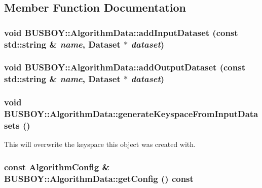 \subsection{Member Function Documentation}
\hypertarget{classBUSBOY_1_1AlgorithmData_a23f52c3ffb2d7f2806014f862449b813}{
\subsubsection[{addInputDataset}]{\setlength{\rightskip}{0pt plus 5cm}void BUSBOY::AlgorithmData::addInputDataset (const std::string \& {\em name}, \/  {\bf Dataset} $\ast$ {\em dataset})}}
\label{classBUSBOY_1_1AlgorithmData_a23f52c3ffb2d7f2806014f862449b813}
\hypertarget{classBUSBOY_1_1AlgorithmData_affca1d960445e7bb5b05b7e4878ccaf9}{
\subsubsection[{addOutputDataset}]{\setlength{\rightskip}{0pt plus 5cm}void BUSBOY::AlgorithmData::addOutputDataset (const std::string \& {\em name}, \/  {\bf Dataset} $\ast$ {\em dataset})}}
\label{classBUSBOY_1_1AlgorithmData_affca1d960445e7bb5b05b7e4878ccaf9}
\hypertarget{classBUSBOY_1_1AlgorithmData_a8d530109cffd59b9274dbe9890173446}{
\subsubsection[{generateKeyspaceFromInputDatasets}]{\setlength{\rightskip}{0pt plus 5cm}void BUSBOY::AlgorithmData::generateKeyspaceFromInputDatasets ()}}
\label{classBUSBOY_1_1AlgorithmData_a8d530109cffd59b9274dbe9890173446}


This will overwrite the keyspace this object was created with. \hypertarget{classBUSBOY_1_1AlgorithmData_ad7d54667699f4db65b9bfa32e2d8f21b}{
\subsubsection[{getConfig}]{\setlength{\rightskip}{0pt plus 5cm}const {\bf AlgorithmConfig} \& BUSBOY::AlgorithmData::getConfig () const}}
\label{classBUSBOY_1_1AlgorithmData_ad7d54667699f4db65b9bfa32e2d8f21b}


